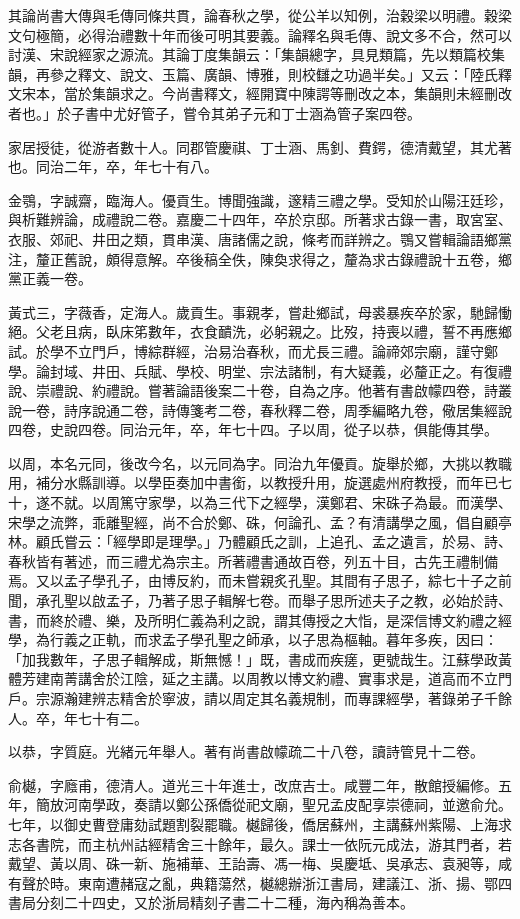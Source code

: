\begin{pinyinscope}
其論尚書大傳與毛傳同條共貫，論春秋之學，從公羊以知例，治穀梁以明禮。穀梁文句極簡，必得治禮數十年而後可明其要義。論釋名與毛傳、說文多不合，然可以討漢、宋說經家之源流。其論丁度集韻云：「集韻總字，具見類篇，先以類篇校集韻，再參之釋文、說文、玉篇、廣韻、博雅，則校讎之功過半矣。」又云：「陸氏釋文宋本，當於集韻求之。今尚書釋文，經開寶中陳諤等刪改之本，集韻則未經刪改者也。」於子書中尤好管子，嘗令其弟子元和丁士涵為管子案四卷。

家居授徒，從游者數十人。同郡管慶祺、丁士涵、馬釗、費鍔，德清戴望，其尤著也。同治二年，卒，年七十有八。

金鶚，字誠齋，臨海人。優貢生。博聞強識，邃精三禮之學。受知於山陽汪廷珍，與析難辨論，成禮說二卷。嘉慶二十四年，卒於京邸。所著求古錄一書，取宮室、衣服、郊祀、井田之類，貫串漢、唐諸儒之說，條考而詳辨之。鶚又嘗輯論語鄉黨注，釐正舊說，頗得意解。卒後稿全佚，陳奐求得之，釐為求古錄禮說十五卷，鄉黨正義一卷。

黃式三，字薇香，定海人。歲貢生。事親孝，嘗赴鄉試，母裘暴疾卒於家，馳歸慟絕。父老且病，臥床笫數年，衣食靧洗，必躬親之。比歿，持喪以禮，誓不再應鄉試。於學不立門戶，博綜群經，治易治春秋，而尤長三禮。論禘郊宗廟，謹守鄭學。論封域、井田、兵賦、學校、明堂、宗法諸制，有大疑義，必釐正之。有復禮說、崇禮說、約禮說。嘗著論語後案二十卷，自為之序。他著有書啟幪四卷，詩叢說一卷，詩序說通二卷，詩傳箋考二卷，春秋釋二卷，周季編略九卷，儆居集經說四卷，史說四卷。同治元年，卒，年七十四。子以周，從子以恭，俱能傳其學。

以周，本名元同，後改今名，以元同為字。同治九年優貢。旋舉於鄉，大挑以教職用，補分水縣訓導。以學臣奏加中書銜，以教授升用，旋選處州府教授，而年已七十，遂不就。以周篤守家學，以為三代下之經學，漢鄭君、宋硃子為最。而漢學、宋學之流弊，乖離聖經，尚不合於鄭、硃，何論孔、孟？有清講學之風，倡自顧亭林。顧氏嘗云：「經學即是理學。」乃體顧氏之訓，上追孔、孟之遺言，於易、詩、春秋皆有著述，而三禮尤為宗主。所著禮書通故百卷，列五十目，古先王禮制備焉。又以孟子學孔子，由博反約，而未嘗親炙孔聖。其間有子思子，綜七十子之前聞，承孔聖以啟孟子，乃著子思子輯解七卷。而舉子思所述夫子之教，必始於詩、書，而終於禮、樂，及所明仁義為利之說，謂其傳授之大恉，是深信博文約禮之經學，為行義之正軌，而求孟子學孔聖之師承，以子思為樞軸。暮年多疾，因曰：「加我數年，子思子輯解成，斯無憾！」既，書成而疾瘥，更號哉生。江蘇學政黃體芳建南菁講舍於江陰，延之主講。以周教以博文約禮、實事求是，道高而不立門戶。宗源瀚建辨志精舍於寧波，請以周定其名義規制，而專課經學，著錄弟子千餘人。卒，年七十有二。

以恭，字質庭。光緒元年舉人。著有尚書啟幪疏二十八卷，讀詩管見十二卷。

俞樾，字廕甫，德清人。道光三十年進士，改庶吉士。咸豐二年，散館授編修。五年，簡放河南學政，奏請以鄭公孫僑從祀文廟，聖兄孟皮配享崇德祠，並邀俞允。七年，以御史曹登庸劾試題割裂罷職。樾歸後，僑居蘇州，主講蘇州紫陽、上海求志各書院，而主杭州詁經精舍三十餘年，最久。課士一依阮元成法，游其門者，若戴望、黃以周、硃一新、施補華、王詒壽、馮一梅、吳慶坻、吳承志、袁昶等，咸有聲於時。東南遭赭寇之亂，典籍蕩然，樾總辦浙江書局，建議江、浙、揚、鄂四書局分刻二十四史，又於浙局精刻子書二十二種，海內稱為善本。


\end{pinyinscope}
